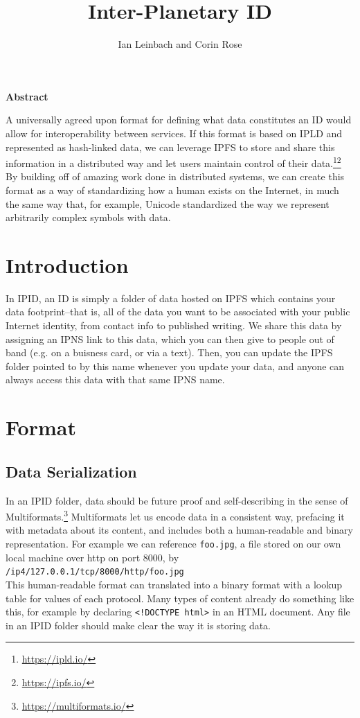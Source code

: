 \documentclass{article}
\author{Ian Leinbach and Corin Rose}
\title{Inter-Planetary ID}
\begin{document}
\maketitle

\begin{center}
\textbf{Abstract} 
\end{center}

A universally agreed upon format for defining what data constitutes an ID would allow for interoperability between services. If this format is based on IPLD and represented as hash-linked data, we can leverage IPFS to store and share this information in a distributed way and let users maintain control of their data.\footnote{\url{https://ipld.io/}}\footnote{\url{https://ipfs.io/}} By building off of amazing work done in distributed systems, we can create this format as a way of standardizing how a human exists on the Internet, in much the same way that, for example, Unicode standardized the way we represent arbitrarily complex symbols with data.  

\section{Introduction}
In IPID, an ID is simply a folder of data hosted on IPFS which contains your data footprint--that is, all of the data you want to be associated with your public Internet identity, from contact info to published writing. We share this data by assigning an IPNS link to this data, which you can then give to people out of band (e.g. on a buisness card, or via a text). Then, you can update the IPFS folder pointed to by this name whenever you update your data, and anyone can always access this data with that same IPNS name. 

\section{Format}

\subsection{Data Serialization}

In an IPID folder, data should be future proof and self-describing in the sense of Multiformats.\footnote{\url{https://multiformats.io/}} Multiformats let us encode data in a consistent way, prefacing it with metadata about its content, and includes both a human-readable and binary representation. For example we can reference \texttt{foo.jpg}, a file stored on our own local machine over http on port 8000, by \\ \texttt{/ip4/127.0.0.1/tcp/8000/http\-/foo.jpg} \\ This human-readable format can translated into a binary format with a lookup table for values of each protocol. Many types of content already do something like this, for example by declaring \texttt{<!DOCTYPE html>} in an HTML document. Any file in an IPID folder should make clear the way it is storing data.   
\end{document}
